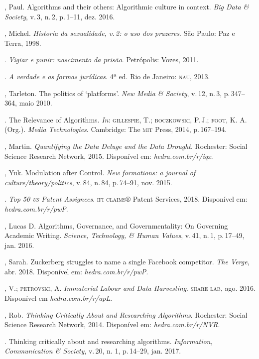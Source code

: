 \begin{bibliohedra}
, Paul. Algorithms and their others: Algorithmic culture in
context. \textit{Big Data \& Society}, v.\,3, n.\,2, p.\,1--11, dez. 2016.

, Michel. \textit{Historia da sexualidade, v.\,2: o uso dos prazeres}.
São Paulo: Paz e Terra, 1998.

\titidem. \textit{Vigiar e punir: nascimento da prisão}. Petrópolis:
Vozes, 2011.

\titidem. \textit{A verdade e as formas jurídicas}. 4ª ed. Rio de Janeiro: \textsc{nau}, 2013.

, Tarleton. The politics of `platforms'. \textit{New Media \&
Society}, v.\,12, n.\,3, p.\,347--364, maio 2010.

\titidem. The Relevance of Algorithms. \textit{In}:
\textsc{gillespie}, T.; \textsc{boczkowski}, P.\,J.; \textsc{foot}, K. A. (Org.). \textit{Media
Technologies}. Cambridge: The \textsc{mit} Press, 2014, p.\,167--194.

, Martin. \textit{Quantifying the Data Deluge and the Data Drought}.
Rochester: Social Science Research Network, 2015. Disponível em: \textit{hedra.com.br/r/iqx}.

, Yuk. Modulation after Control. \textit{New formations: a journal of
culture/theory/politics}, v.\,84, n.\,84, p.\,74--91, nov. 2015.

. \textit{Top 50 \textsc{us} Patent Assignees}. \textsc{ifi claims}® Patent Services, 2018. Disponível em: \textit{hedra.com.br/r/pwP}.

, Lucas D. Algorithms, Governance, and Governmentality: On
Governing Academic Writing. \textit{Science, Technology, \& Human
Values}, v.\,41, n.\,1, p.\,17--49, jan. 2016.

, Sarah. Zuckerberg struggles to name a single Facebook
competitor. \textit{The Verge}, abr. 2018. Disponível em: \textit{hedra.com.br/r/pwP}.

, V.; \textsc{petrovski}, A. \textit{Immaterial Labour and Data Harvesting}.
\textsc{share lab}, ago. 2016. Disponível em \textit{hedra.com.br/r/apL}.

, Rob. \textit{Thinking Critically About and Researching
Algorithms}. Rochester: Social Science Research Network, 2014.
Disponível em: \textit{hedra.com.br/r/NVR}.

\titidem. Thinking critically about and researching
algorithms. \textit{Information, Communication \& Society}, v.\,20,
n. 1, p.\,14--29, jan. 2017.


\end{bibliohedra}
